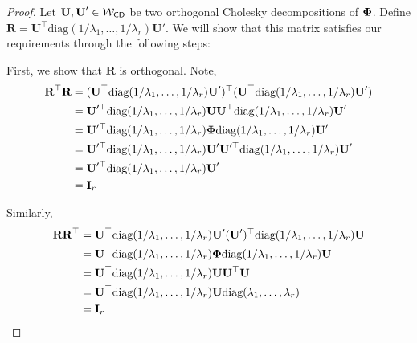 \begin{proof}
Let $\textbf{U}, \textbf{U}' \in {\mathcal{W}}_{\textsf{CD}}$ be two orthogonal Cholesky decompositions of $\boldsymbol{\Phi}$. Define $\textbf{R} = \textbf{U}^\top \text{diag}(1/\lambda_1,\ldots,1/\lambda_r)\textbf{U}'$. We will show that this matrix satisfies our requirements through the following steps:

First, we show that $\textbf{R}$ is orthogonal. Note,
\begin{align*}
    \textbf{R}^\top \textbf{R} &= (\textbf{U}^\top \text{diag}(1/\lambda_1,\ldots,1/\lambda_r)\textbf{U}')^\top (\textbf{U}^\top \text{diag}(1/\lambda_1,\ldots,1/\lambda_r)\textbf{U}') \\
    &= \textbf{U}'^\top \text{diag}(1/\lambda_1,\ldots,1/\lambda_r)\textbf{U} \textbf{U}^\top \text{diag}(1/\lambda_1,\ldots,1/\lambda_r)\textbf{U}' \\
    &= \textbf{U}'^\top \text{diag}(1/\lambda_1,\ldots,1/\lambda_r)\pphi \text{diag}(1/\lambda_1,\ldots,1/\lambda_r)\textbf{U}' \\
    &= \textbf{U}'^\top \text{diag}(1/\lambda_1,\ldots,1/\lambda_r)\textbf{U}'\textbf{U}'^\top \text{diag}(1/\lambda_1,\ldots,1/\lambda_r)\textbf{U}' \\
    &= \textbf{U}'^\top \text{diag}(1/\lambda_1,\ldots,1/\lambda_r)\textbf{U}'\\%
    &= \textbf{I}_r
\end{align*}

Similarly,
\begin{align*}
    \textbf{R}\textbf{R}^\top &= \textbf{U}^\top \text{diag}(1/\lambda_1,\ldots,1/\lambda_r)\textbf{U}'(\textbf{U}')^\top \text{diag}(1/\lambda_1,\ldots,1/\lambda_r)\textbf{U} \\
    &= \textbf{U}^\top \text{diag}(1/\lambda_1,\ldots,1/\lambda_r)\boldsymbol{\Phi} \text{diag}(1/\lambda_1,\ldots,1/\lambda_r)\textbf{U} \\
    &= \textbf{U}^\top \text{diag}(1/\lambda_1,\ldots,1/\lambda_r)\textbf{U}\textbf{U}^\top\textbf{U} \\
    &= \textbf{U}^\top \text{diag}(1/\lambda_1,\ldots,1/\lambda_r)\textbf{U}\text{diag}(\lambda_1,\ldots,\lambda_r) \\
    &= \textbf{I}_r
\end{align*}


\end{proof}
